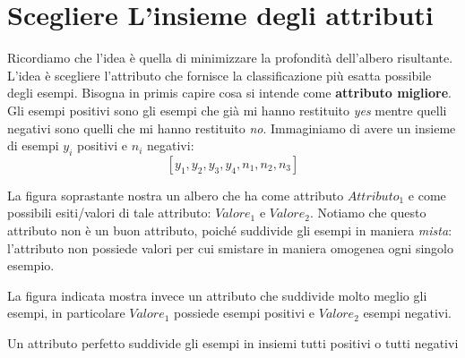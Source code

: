 \section{Scegliere L'insieme degli attributi}
Ricordiamo che l'idea è quella di minimizzare la profondità dell'albero risultante. L'idea è scegliere l'attributo che fornisce la classificazione più esatta possibile degli esempi.
Bisogna in primis capire cosa si intende come \textbf{attributo migliore}.
Gli esempi positivi sono gli esempi che già mi hanno restituito \textit{yes} mentre quelli negativi sono quelli che mi hanno restituito \textit{no}.
Immaginiamo di avere un insieme di esempi $y_i$ positivi e $n_i$ negativi: \[ [y_1, y_2, y_3, y_4, n_1, n_2, n_3]\]
\begin{figure}[H]
  \centering
\end{figure}
La figura soprastante nostra un albero che ha come attributo $Attributo_1$ e come possibili esiti/valori di tale attributo: $Valore_1$ e $Valore_2$. Notiamo che questo attributo non è un buon attributo, poiché suddivide gli esempi in maniera \textit{mista}: l'attributo non possiede valori per cui smistare in maniera omogenea ogni singolo esempio.
\begin{figure}[H]
  \centering
  \label{Albero2}
\end{figure}
La figura indicata mostra invece un attributo che suddivide molto meglio gli esempi, in particolare $Valore_1$ possiede esempi positivi e $Valore_2$ esempi negativi.
\begin{definizione}
  Un attributo perfetto suddivide gli esempi in insiemi tutti positivi o tutti negativi
\end{definizione}

